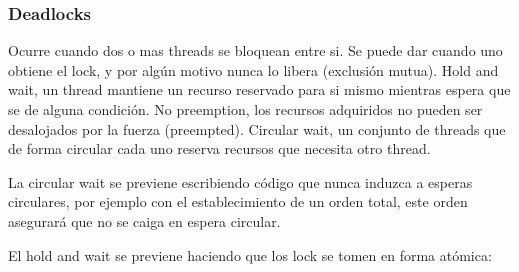 \documentclass[titlepage,a4paper]{article}
\begin{document}
\subsubsection*{Deadlocks}
Ocurre cuando dos o mas threads se bloquean entre si. Se puede dar cuando uno obtiene el lock, y por algún motivo nunca lo libera (exclusión mutua). Hold and wait, un thread mantiene un recurso reservado para si mismo mientras espera que se de alguna condición. No preemption, los recursos adquiridos no pueden ser desalojados por la fuerza (preempted). Circular wait, un conjunto de threads que de forma circular cada uno reserva recursos que necesita otro thread.

La circular wait se previene escribiendo código que nunca induzca a esperas circulares, por ejemplo con el establecimiento de un orden total, este orden asegurará que no se caiga en espera circular.

El hold and wait se previene haciendo que los lock se tomen en forma atómica:
\end{document}
